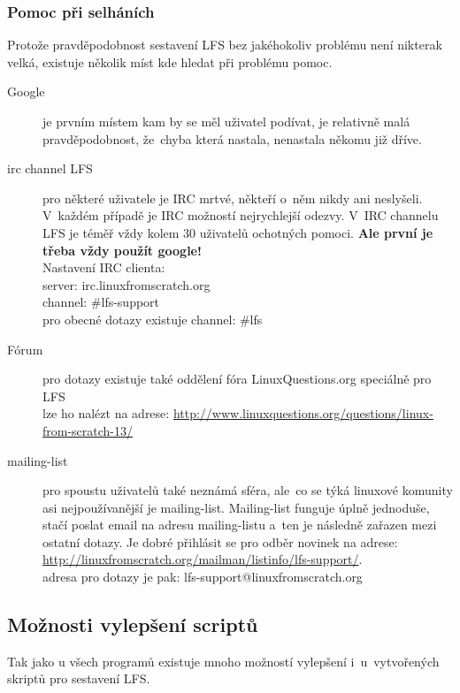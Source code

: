 \documentclass[a4paper,12pt]{article}
\renewcommand{\b}[1]{\textbf{#1}} %
\begin{document}
\subsubsection{Pomoc při selháních}\label{sec:help}
Protože pravděpodobnost sestavení LFS bez jakéhokoliv problému není nikterak velká, existuje několik míst kde hledat při problému pomoc.

\begin{description}
 \item[Google] je prvním místem kam by se měl uživatel podívat, je relativně malá pravděpodobnost, že~chyba která nastala, nenastala někomu již dříve.
 \item[irc channel LFS] pro některé uživatele je IRC mrtvé, někteří o~něm nikdy ani neslyšeli. V~každém případě je IRC možností nejrychlejší odezvy. V~IRC channelu LFS je téměř vždy kolem 30 uživatelů ochotných pomoci. \b{Ale první je třeba vždy použít google!}\\
Nastavení IRC clienta:\\
server: irc.linuxfromscratch.org\\
channel: \#lfs-support\\
pro obecné dotazy existuje channel: \#lfs\\
 \item[Fórum] pro dotazy existuje také oddělení fóra LinuxQuestions.org speciálně pro LFS\\
  lze ho nalézt na adrese: \href{http://www.linuxquestions.org/questions/linux-from-scratch-13/}{http://www.linuxquestions.org/questions/linux-from-scratch-13/}
 \item[mailing-list] pro spoustu uživatelů také neznámá sféra, ale~co se týká linuxové komunity asi nejpoužívanější je mailing-list. Mailing-list funguje úplně jednoduše, stačí poslat email na adresu mailing-listu a~ten je následně zařazen mezi ostatní dotazy. Je dobré přihlásit se pro odběr novinek na adrese:\\ \href{http://linuxfromscratch.org/mailman/listinfo/lfs-support/}{http://linuxfromscratch.org/mailman/listinfo/lfs-support/}.\\
adresa pro dotazy je pak: lfs-support@linuxfromscratch.org
 \end{description}

\subsection{Možnosti vylepšení scriptů}
Tak jako u všech programů existuje mnoho možností vylepšení i~u~vytvořených skriptů pro sestavení LFS.\\
\end{document}
